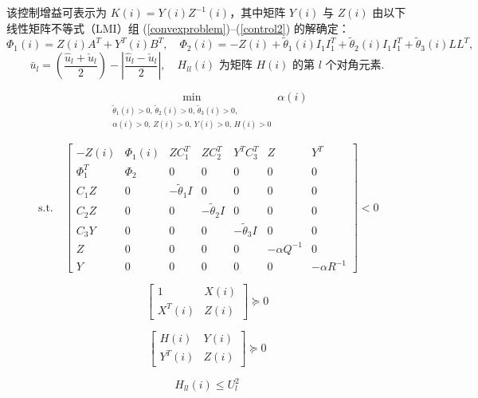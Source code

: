该控制增益可表示为 $K(i) = Y(i) Z^{-1}(i)$，其中矩阵 $Y(i)$ 与 $Z(i)$ 由以下线性矩阵不等式（LMI）组 (\ref{convexproblem})–(\ref{control2}) 的解确定：
\[
\Phi_{1}(i) = Z(i) A^{\!T} + Y^{\!T}(i) B^{\!T}, \quad
\Phi_{2}(i) = -Z(i) + \tilde{\theta}_{1}(i) I_{1} I_{1}^{\!T} + \tilde{\theta}_{2}(i) I_{1} I_{1}^{\!T} + \tilde{\theta}_{3}(i) L L^{\!T},
\]
\[
\bar{u}_{l} = \left( \frac{\hat{u}_{l} + \check{u}_{l}}{2} \right) - \left| \frac{\hat{u}_{l} - \check{u}_{l}}{2} \right|, \quad
H_{ll}(i) \text{ 为矩阵 } H(i) \text{ 的第 } l \text{ 个对角元素}.
\]

\begin{figure}
    \begin{equation}
    \label{convexproblem}
    \min_{\substack{
        \tilde{\theta}_{1}(i)>0,\, \tilde{\theta}_{2}(i)>0,\, \tilde{\theta}_{3}(i)>0, \\
        \alpha(i)>0,\, Z(i)>0,\, Y(i)>0,\, H(i)>0
    }} \alpha(i)
    \end{equation}
    
    \begin{equation}
    \label{inequality1}
    \text{s.t.} \quad
    \begin{bmatrix}
    -Z(i) & \Phi_{1}(i) & Z C_{1}^{\!T} & Z C_{2}^{\!T} & Y^{\!T} C_{3}^{\!T} & Z & Y^{\!T} \\
    \Phi_{1}^{\!T} & \Phi_{2} & 0 & 0 & 0 & 0 & 0 \\
    C_{1} Z & 0 & -\tilde{\theta}_{1} I & 0 & 0 & 0 & 0 \\
    C_{2} Z & 0 & 0 & -\tilde{\theta}_{2} I & 0 & 0 & 0 \\
    C_{3} Y & 0 & 0 & 0 & -\tilde{\theta}_{3} I & 0 & 0 \\
    Z & 0 & 0 & 0 & 0 & -\alpha Q^{-1} & 0 \\
    Y & 0 & 0 & 0 & 0 & 0 & -\alpha R^{-1}
    \end{bmatrix} < 0
    \end{equation}
    
    \begin{equation}
    \label{maincondition2}
    \begin{bmatrix}
    1 & X(i) \\
    X^{\!T}(i) & Z(i)
    \end{bmatrix} \succeq 0
    \end{equation}
    
    \begin{equation}
    \label{control1}
    \begin{bmatrix}
    H(i) & Y(i) \\
    Y^{\!T}(i) & Z(i)
    \end{bmatrix} \succeq 0
    \end{equation}
    
    \begin{equation}
    \label{control2}
    H_{ll}(i) \leq U_{l}^{2}
    \end{equation}
    \hrulefill
    \vspace{-1em}
\end{figure}

